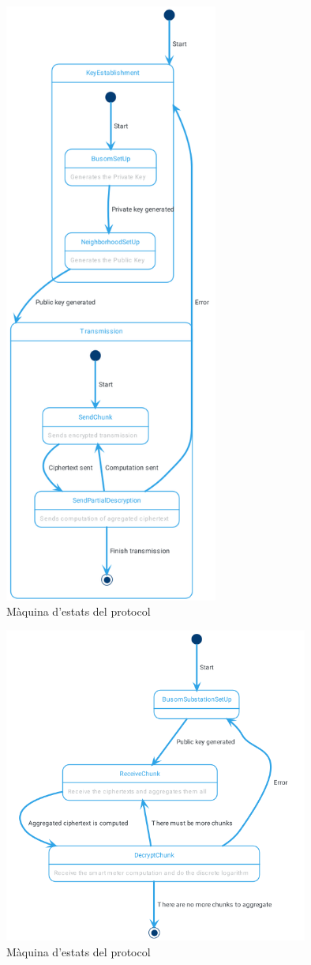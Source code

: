 \begin{figure}[H]
	\centering
	\includegraphics[width=7cm]{classes/busomstatemeter.png}
	\caption{Màquina d'estats del protocol \cite{busom}}
	\label{fig:busom-state}
\end{figure}
\begin{figure}[H]
	\centering
	\includegraphics[width=10cm]{classes/busomstatesub.png}
	\caption{Màquina d'estats del protocol \cite{busom}}
	\label{fig:busom-state-sub}
\end{figure}


